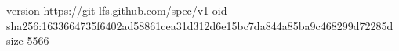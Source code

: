 version https://git-lfs.github.com/spec/v1
oid sha256:1633664735f6402ad58861cea31d312d6e15bc7da844a85ba9c468299d72285d
size 5566
